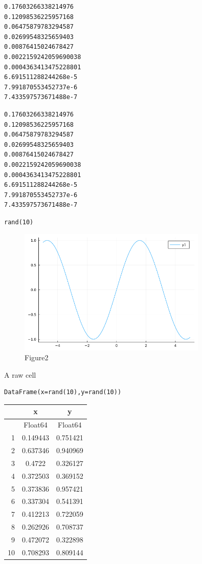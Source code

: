 \begin{verbatim}
0.17603266338214976
0.12098536225957168
0.06475879783294587
0.02699548325659403
0.00876415024678427
0.0022159242059690038
0.0004363413475228801
6.691511288244268e-5
7.991870553452737e-6
7.433597573671488e-7

\end{verbatim}

\begin{verbatim}
0.17603266338214976
0.12098536225957168
0.06475879783294587
0.02699548325659403
0.00876415024678427
0.0022159242059690038
0.0004363413475228801
6.691511288244268e-5
7.991870553452737e-6
7.433597573671488e-7

\end{verbatim}

\begin{lstlisting}[language=JuliaLocal, style=julia]
rand(10)
\end{lstlisting}

\begin{figure}[H]
	 \centering
	\includegraphics[width=0.8\textwidth]{./figures/plotexample.png}
	\caption{Figure2}
	\label{fig:plotexample.png}
\end{figure}
A raw cell
\begin{lstlisting}[language=JuliaLocal, style=julia]
DataFrame(x=rand(10),y=rand(10))
\end{lstlisting}

\begin{tabular}{r|cc}
	& x & y\\
	\hline
	& Float64 & Float64\\
	\hline
	1 & 0.149443 & 0.751421 \\
	2 & 0.637346 & 0.940969 \\
	3 & 0.4722 & 0.326127 \\
	4 & 0.372503 & 0.369152 \\
	5 & 0.373836 & 0.957421 \\
	6 & 0.337304 & 0.541391 \\
	7 & 0.412213 & 0.722059 \\
	8 & 0.262926 & 0.708737 \\
	9 & 0.472072 & 0.322898 \\
	10 & 0.708293 & 0.809144 \\
\end{tabular}
